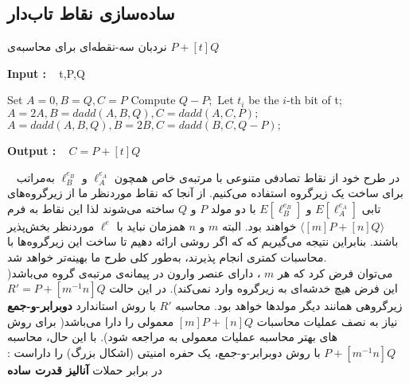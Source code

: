 \subsection{ساده‌سازی نقاط تاب‌دار}\label{sampling_torsion_points}
\begin{algorithm}\label{algorithm_ladder}
	\caption{نردبان سه-نقطه‌ای برای محاسبه‌ی $P + [t]Q$}
	\begin{latin}
		\textbf{Input :} ~ t,P,Q
		\begin{algorithmic}[1]
			\State Set $A=0, B=Q, C=P$
			\State Compute $Q-P ;$
			\State Let $t_i$ be the $i$-th bit of t;
			\State $A=2A, B=dadd(A,B,Q), C=dadd(A,C,P);$
			\Else
			\State $A=dadd(A,B,Q), B=2B, C=dadd(B,C,Q-P);$
			\EndIf
			\EndFor	
		\end{algorithmic}
		\textbf{Output :} ~ $C=P+[t]Q$
	\end{latin}
\end{algorithm}~
در طرح خود از نقاط تصادفی متنوعی با مرتبه‌ی خاص همچون 
$\ell_A^{e_A}$
و
$\ell_B^{e_B}$
به‌مراتب برای ساخت یک زیرگروه استفاده می‌کنیم. از آنجا که نقاط موردنظر ما از زیرگروه‌های تابی  
$E[\ell_A^{e_A}]$
و
$E[\ell_B^{e_B}]$
با دو مولد
$P$
و
$Q$
ساخته می‌شوند لذا این نقاط به فرم
$\langle [m]P + [n] Q \rangle $
خواهند بود. البته
$m$
و
$n$
همزمان نباید با
$\ell^e$
موردنظر بخش‌پذیر باشند. بنابراین نتیجه می‌گیریم که که اگر روشی ارائه دهیم تا ساخت این زیرگروه‌ها با محاسبات کمتری انجام پذیرند، به‌طور کلی طرح ما بهینه‌تر خواهد شد.
\\
می‌توان فرض کرد که هر
$m$
، دارای عنصر وارون در پیمانه‌ی مرتبه‌ی گروه می‌باشد( این فرض هیچ خدشه‌ای به زیرگروه وارد نمی‌کند). در این حالت 
$R' = P + [m^{-1}n]Q$
زیرگروهی همانند دیگر مولدها خواهد بود. محاسبه 
$R'$
با روش استاندارد  
\textbf{دوبرابر-و-جمع} 
نیاز به نصف عملیات محاسبات
$[m]P + [n]Q$
معمولی را دارا می‌باشد( برای روش های بهتر محاسبه عملیات معمولی به مراجعه 
\cite{ antipa, elgamal, solinas}
شود). با این حال،  محاسبه 
$P + [m^{-1}n]Q$
با روش دوبرابر-و-جمع، یک حفره امنیتی (اشکال بزرگ) را داراست : در برابر حملات 
\textbf{آنالیز قدرت ساده } 
